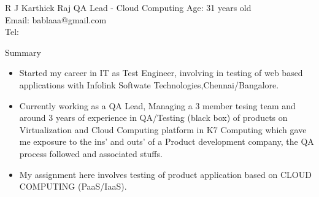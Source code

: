 \documentclass[a4paper,12pt]{article}
\begin{document}
\setmainfont



\header
{R J Karthick Raj}
{QA Lead - Cloud Computing}
{Age: 31 years old\\
Email: bablaaa@gmail.com\\
Tel: }
\newline
\newline

\begin{resumesummary}{Summary}
\begin{itemize}
  \item Started my career in IT as Test Engineer, involving in testing of web based applications with Infolink Softwate Technologies,Chennai/Bangalore.
  \item Currently working as a QA Lead, Managing a 3 member tesing team and around 3 years of experience in QA/Testing (black box) of products on Virtualization and Cloud Computing platform in K7 Computing which gave me exposure to the ins' and outs' of a Product development company, the QA process followed and associated stuffs.
  \item My assignment here involves testing of product application based on CLOUD COMPUTING (PaaS/IaaS). 
\newline
\end{itemize}
\end{resumesummary}

\end{document}
